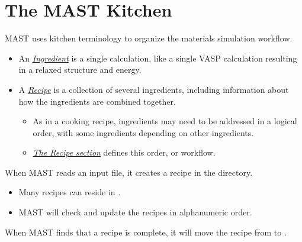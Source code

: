 \documentclass[letterpaper,10pt,english]{sphinxmanual}
\begin{document}
\section{The MAST Kitchen}
\label{0_0_introduction:the-mast-kitchen}
MAST uses kitchen terminology to organize the materials simulation workflow.
\begin{itemize}
\item {} 
An {\hyperref[2_0_ingredients::doc]{\emph{Ingredient}}} is a single calculation, like a single VASP calculation resulting in a relaxed structure and energy.

\item {} 
A {\hyperref[4_0_recipe::doc]{\emph{Recipe}}} is a collection of several ingredients, including information about how the ingredients are combined together.
\begin{itemize}
\item {} 
As in a cooking recipe, ingredients may need to be addressed in a logical order, with some ingredients depending on other ingredients.

\item {} 
{\hyperref[3_1_3_recipe::doc]{\emph{The Recipe section}}} defines this order, or workflow.

\end{itemize}

\end{itemize}

When MAST reads an input file, it creates a recipe in the  directory.
\begin{itemize}
\item {} 
Many recipes can reside in .

\item {} 
MAST will check and update the recipes in alphanumeric order.

\end{itemize}

When MAST finds that a recipe is complete, it will move the recipe from  to .
\end{document}
